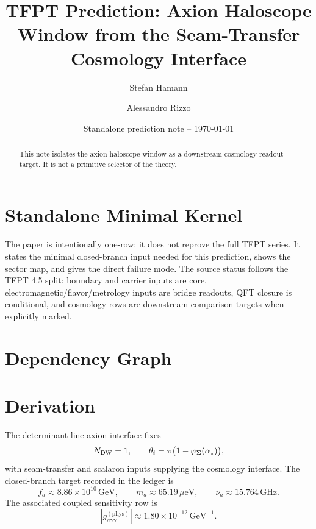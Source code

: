 \documentclass[11pt,a4paper]{article}
\title{\color{tfptblue}\textbf{TFPT Prediction: Axion Haloscope Window from the Seam-Transfer Cosmology Interface}}
\author{Stefan Hamann \and Alessandro Rizzo}
\date{{\normalsize\color{tfptgray}\sffamily Standalone prediction note -- \today}}
\begin{document}
\maketitle

\begin{abstract}
This note isolates the axion haloscope window as a downstream cosmology readout target. It is not a primitive selector of the theory.
\end{abstract}



\section{Standalone Minimal Kernel}
\MinimalKernelBox

The paper is intentionally one-row: it does not reprove the full TFPT series. It states the minimal closed-branch input needed for this prediction, shows the sector map, and gives the direct failure mode. The source status follows the TFPT 4.5 split: boundary and carrier inputs are core, electromagnetic/flavor/metrology inputs are bridge readouts, QFT closure is conditional, and cosmology rows are downstream comparison targets when explicitly marked.


\section{Dependency Graph}

\section{Derivation}

The determinant-line axion interface fixes
\[
N_{\mathrm{DW}}=1,
\qquad
\theta_i=\pi\bigl(1-\varphi_{\Sigma}(\alpha_\star)\bigr),
\]
with seam-transfer and scalaron inputs supplying the cosmology interface. The closed-branch target recorded in the ledger is
\[
f_a\approx8.86\times10^{10}\,\mathrm{GeV},
\qquad
m_a\approx65.19\,\mu\mathrm{eV},
\qquad
\nu_a\approx15.764\,\mathrm{GHz}.
\]
The associated coupled sensitivity row is
\[
|g_{a\gamma\gamma}^{(\mathrm{phys})}|\approx1.80\times10^{-12}\,\mathrm{GeV}^{-1}.
\]
\end{document}
